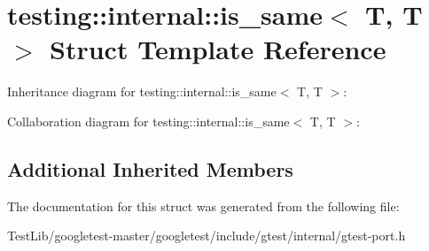 \hypertarget{structtesting_1_1internal_1_1is__same_3_01T_00_01T_01_4}{}\section{testing\+:\+:internal\+:\+:is\+\_\+same$<$ T, T $>$ Struct Template Reference}
\label{structtesting_1_1internal_1_1is__same_3_01T_00_01T_01_4}


Inheritance diagram for testing\+:\+:internal\+:\+:is\+\_\+same$<$ T, T $>$\+:


Collaboration diagram for testing\+:\+:internal\+:\+:is\+\_\+same$<$ T, T $>$\+:
\subsection*{Additional Inherited Members}


The documentation for this struct was generated from the following file\+:\begin{DoxyCompactItemize}
\item 
Test\+Lib/googletest-\/master/googletest/include/gtest/internal/gtest-\/port.\+h\end{DoxyCompactItemize}
